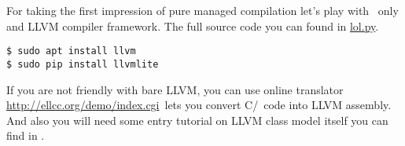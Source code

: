 \clearpage{}\label{llvmpy}

For taking the first impression of pure managed compilation let's play with
\py\ only and LLVM compiler framework. The full source code you can found in
\href{https://github.com/ponyatov/o/blob/master/lol.py}{lol.py}.

\begin{lstlisting}
$ sudo apt install llvm
$ sudo pip install llvmlite
\end{lstlisting}

\noindent
If you are not friendly with bare LLVM, you can use online translator 
\url{http://ellcc.org/demo/index.cgi}\ lets you convert C/\cpp\ code into
LLVM assembly. And also you will need some entry tutorial on LLVM class model
itself you can find in \cite{llvmcore}.

